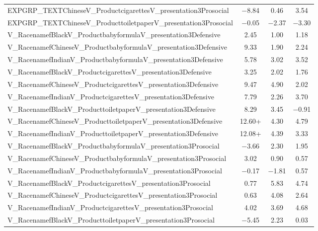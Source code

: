 \documentclass[]{report}
\begin{document}
\begin{table}
{\begin{tabular}[t]{lccc}
		EXPGRP\_TEXTChineseV\_ProductcigarettesV\_presentation3Prosocial & \num{-8.84} & \num{0.46} & \num{3.54}\\
		EXPGRP\_TEXTChineseV\_ProducttoiletpaperV\_presentation3Prosocial & \num{-0.05} & \num{-2.37} & \num{-3.30}\\
		V\_RacenamefBlackV\_ProductbabyformulaV\_presentation3Defensive & \num{2.45} & \num{1.00} & \num{1.18}\\
		V\_RacenamefChineseV\_ProductbabyformulaV\_presentation3Defensive & \num{9.33} & \num{1.90} & \num{2.24}\\
		V\_RacenamefIndianV\_ProductbabyformulaV\_presentation3Defensive & \num{5.78} & \num{3.02} & \num{3.52}\\
		V\_RacenamefBlackV\_ProductcigarettesV\_presentation3Defensive & \num{3.25} & \num{2.02} & \num{1.76}\\
		V\_RacenamefChineseV\_ProductcigarettesV\_presentation3Defensive & \num{9.47} & \num{4.90} & \num{2.02}\\
		V\_RacenamefIndianV\_ProductcigarettesV\_presentation3Defensive & \num{7.79} & \num{2.26} & \num{3.70}\\
		V\_RacenamefBlackV\_ProducttoiletpaperV\_presentation3Defensive & \num{8.29} & \num{3.45} & \num{-0.91}\\
		V\_RacenamefChineseV\_ProducttoiletpaperV\_presentation3Defensive & \num{12.60}+ & \num{4.30} & \num{4.79}\\
		V\_RacenamefIndianV\_ProducttoiletpaperV\_presentation3Defensive & \num{12.08}+ & \num{4.39} & \num{3.33}\\
		V\_RacenamefBlackV\_ProductbabyformulaV\_presentation3Prosocial & \num{-3.66} & \num{2.30} & \num{1.95}\\
		V\_RacenamefChineseV\_ProductbabyformulaV\_presentation3Prosocial & \num{3.02} & \num{0.90} & \num{0.57}\\
		V\_RacenamefIndianV\_ProductbabyformulaV\_presentation3Prosocial & \num{-0.17} & \num{-1.81} & \num{0.57}\\
		V\_RacenamefBlackV\_ProductcigarettesV\_presentation3Prosocial & \num{0.77} & \num{5.83} & \num{4.74}\\
		V\_RacenamefChineseV\_ProductcigarettesV\_presentation3Prosocial & \num{0.63} & \num{4.08} & \num{2.64}\\
		V\_RacenamefIndianV\_ProductcigarettesV\_presentation3Prosocial & \num{4.02} & \num{3.69} & \num{4.68}\\
		V\_RacenamefBlackV\_ProducttoiletpaperV\_presentation3Prosocial & \num{-5.45} & \num{2.23} & \num{0.03}\\

\end{tabular}}
\end{table}
\end{document}

